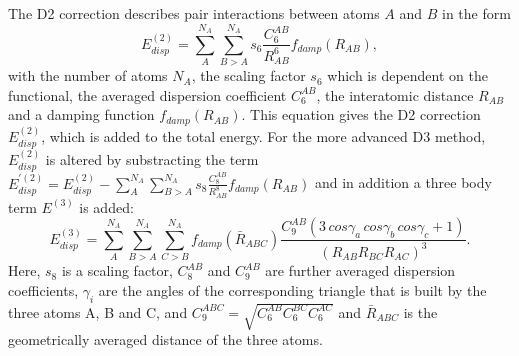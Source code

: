 \documentclass[11pt,DIV=13,BCOR=5mm,a4paper,headinclude]{scrbook}
\begin{document}
The D2 correction describes pair interactions between atoms $A$ and $B$ in the form
\begin{equation}\label{eq:d2}
 E_{disp}^{(2)} =\sum\limits_{A}^{N_A}\sum\limits_{B>A}^{N_A} s_6 \frac{C_6^{AB}}{R_{AB}^6}f_{damp}(R_{AB}),
\end{equation}
with the number of atoms $N_A$, the scaling factor $s_6$ which is dependent on the functional, the averaged dispersion coefficient $C^{AB}_6$, the interatomic distance $R_{AB}$ and a damping function $f_{damp}(R_{AB})$.
This equation gives the D2 correction $E_{disp}^{(2)}$, which is added to the total energy.
For the more advanced D3 method, $E_{disp}^{(2)}$ is altered by substracting the term $E_{disp}^{\prime(2)}=E_{disp}^{(2)} -\sum\limits_{A}^{N_A}\sum\limits_{B>A}^{N_A} s_8 \frac{C_8^{AB}}{R_{AB}^8}f_{damp}(R_{AB})$ and in addition a three body term $E^{(3)}$ is added:
\begin{equation}
  E_{disp}^{(3)} =\sum\limits_{A}^{N_A}\sum\limits_{B>A}^{N_A}\sum\limits_{C>B}^{N_A} f_{damp}(\bar{R}_{ABC}) \frac{C_9^{AB}(3\,cos\gamma_a\, cos\gamma_b\, cos\gamma_c+1)}{(R_{AB}R_{BC}R_{AC})^3}.
\end{equation}
Here, $s_8$ is a scaling factor, $C_8^{AB}$ and $C_9^{AB}$ are further averaged dispersion coefficients, $\gamma_i$ are the angles of the corresponding triangle that is built by the three atoms A, B and C, and $C_9^{ABC}=\sqrt{C_6^{AB}C_6^{BC}C_6^{AC}}$ and $\bar{R}_{ABC}$ is the geometrically averaged distance of the three atoms.


\end{document}
